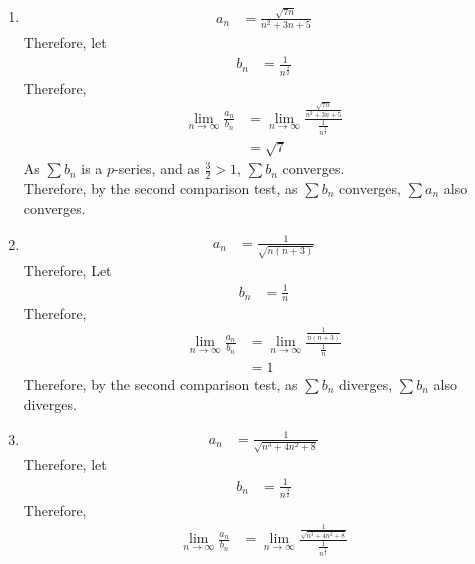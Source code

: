 \documentclass[fleqn, a4paper, 12pt, oneside]{amsart}
\theoremstyle{definition}
\theoremstyle{theorem}
\begin{document}
\begin{solution}
	\begin{enumerate}[label=(\alph*), leftmargin=*]
		\item 
			\begin{align*}
				a_n & = \frac{\sqrt{7 n}}{n^2 + 3 n + 5}
			\end{align*}
			Therefore, let
			\begin{align*}
				b_n & = \frac{1}{n^{\frac{3}{2}}}
			\end{align*}
			Therefore,
			\begin{align*}
				\lim\limits_{n \to \infty} \frac{a_n}{b_n} & = \lim\limits_{n \to \infty} \frac{\frac{\sqrt{7 n}}{n^2 + 3 n + 5}}{\frac{1}{n^{\frac{3}{2}}}} \\
                                                                           & = \sqrt{7}
			\end{align*}
			As $\sum b_n$ is a $p$-series, and as $\frac{3}{2} > 1$, $\sum b_n$ converges.\\
			Therefore, by the second comparison test, as $\sum b_n$ converges, $\sum a_n$ also converges.
		\item
			\begin{align*}
				a_n & = \frac{1}{\sqrt{n (n + 3)}}
			\end{align*}
			Therefore, Let
			\begin{align*}
				b_n & = \frac{1}{n}
			\end{align*}
			Therefore,
			\begin{align*}
				\lim\limits_{n \to \infty} \frac{a_n}{b_n} & = \lim\limits_{n \to \infty} \frac{\frac{1}{n (n + 3)}}{\frac{1}{n}} \\
                                                                           & = 1
			\end{align*}
			Therefore, by the second comparison test, as $\sum b_n$ diverges, $\sum b_n$ also diverges.
		\item
			\begin{align*}
				a_n & = \frac{1}{\sqrt{n^3 + 4 n^2 + 8}}
			\end{align*}
			Therefore, let
			\begin{align*}
				b_n & = \frac{1}{n^{\frac{3}{2}}}
			\end{align*}
			Therefore,
			\begin{align*}
				\lim\limits_{n \to \infty} \frac{a_n}{b_n} & = \lim\limits_{n \to \infty} \frac{\frac{1}{\sqrt{n^3 + 4 n^2 + 8}}}{\frac{1}{n^{\frac{3}{2}}}} \\

\end{align*}
\end{enumerate}
\end{solution}
\end{document}
